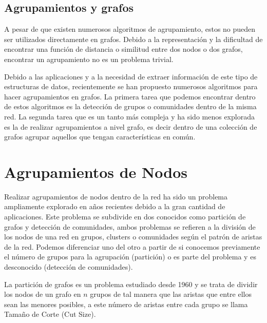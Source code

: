  

\subsection{Agrupamientos y grafos}

A pesar de que existen numerosos algoritmos de agrupamiento, estos no pueden ser utilizados directamente en grafos. Debido a la representación y la dificultad de encontrar una función de distancia o similitud entre dos nodos o dos grafos, encontrar un agrupamiento no es un problema trivial. 

Debido a las aplicaciones y a la necesidad de extraer información de este tipo de estructuras de datos, recientemente se han propuesto numerosos algoritmos para hacer agrupamientos en grafos. La primera tarea que podemos encontrar dentro de estos algoritmos es la detección de grupos o comunidades dentro de la misma red. La segunda tarea que es un tanto más compleja y ha sido menos explorada es la de realizar agrupamientos a nivel grafo, es decir dentro de una colección de grafos agrupar aquellos que tengan características en común.

\section{Agrupamientos de Nodos}
\label{section:nodeclustering}

Realizar agrupamientos de nodos dentro de la red ha sido un problema ampliamente explorado en años recientes debido a la gran cantidad de aplicaciones. Este problema se subdivide en dos conocidos como partición de grafos y detección de comunidades, ambos problemas se refieren a la división de los nodos de una red en grupos, clusters o comunidades según el patrón de aristas de la red.\cite{newman_networks_2010} Podemos diferenciar uno del otro a partir de si conocemos previamente el número de grupos para la agrupación (partición) o es parte del problema y es desconocido (detección de comunidades).

La partición de grafos es un problema estudiado desde 1960 \cite{newman_networks_2010} y se trata de dividir los nodos de un grafo en $n$ grupos de tal manera que las aristas que entre ellos sean las menores posibles, a este número de aristas entre cada grupo se llama Tamaño de Corte (Cut Size). 

